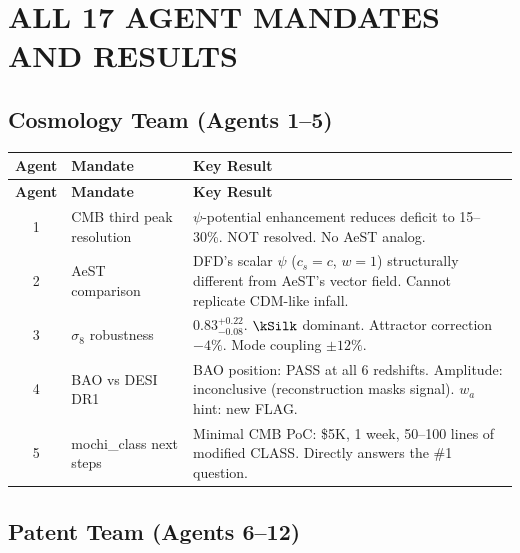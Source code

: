\documentclass[11pt]{article}
\begin{document}
\section{ALL 17 AGENT MANDATES AND RESULTS}

\subsection{Cosmology Team (Agents 1--5)}

\begin{longtable}{clp{8cm}}
\toprule
\textbf{Agent} & \textbf{Mandate} & \textbf{Key Result} \\
\midrule
\endfirsthead
\toprule
\textbf{Agent} & \textbf{Mandate} & \textbf{Key Result} \\
\midrule
\endhead
1 & CMB third peak resolution & $\psi$-potential enhancement reduces deficit
  to 15--30\%.  NOT resolved.  No AeST analog. \\
2 & AeST comparison & DFD's scalar $\psi$ ($c_s=c$, $w=1$) structurally
  different from AeST's vector field.  Cannot replicate CDM-like infall. \\
3 & $\sigma_8$ robustness & $0.83^{+0.22}_{-0.08}$.  $\kSilk$ dominant.
  Attractor correction $-4\%$.  Mode coupling $\pm 12\%$. \\
4 & BAO vs DESI DR1 & BAO position: PASS at all 6 redshifts.  Amplitude:
  inconclusive (reconstruction masks signal).  $w_a$ hint: new FLAG. \\
5 & mochi\_class next steps & Minimal CMB PoC: \$5K, 1 week, 50--100
  lines of modified CLASS.  Directly answers the \#1 question. \\
\bottomrule
\end{longtable}


\subsection{Patent Team (Agents 6--12)}
\end{document}
